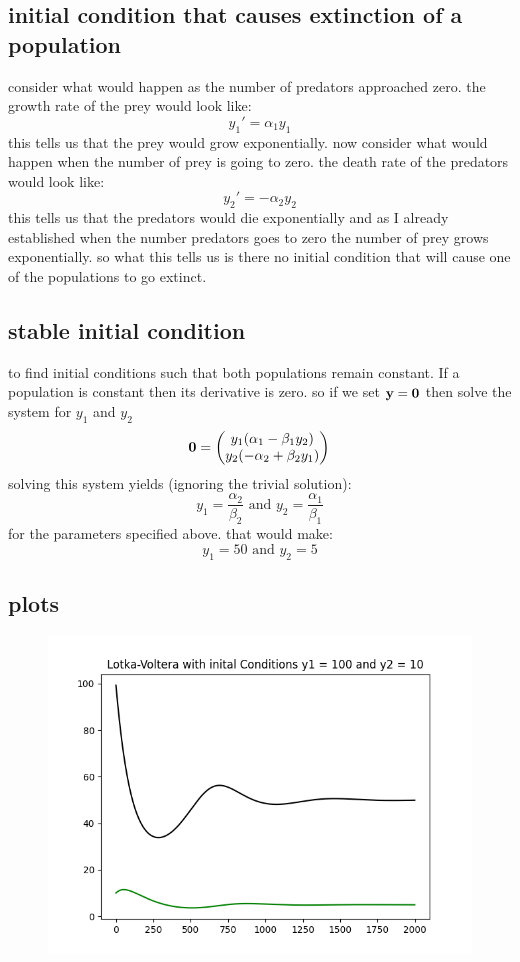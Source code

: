 \documentclass{article}
\begin{document}
\subsection{initial condition that causes extinction of a population}
consider what would happen as the number of predators approached zero. the growth rate of the prey would look like:
$$y_1' = \alpha_1y_1$$
this tells us that the prey would grow exponentially.
now consider what would happen when the number of prey is going to zero. the death rate of the predators would look like:
$$y_2' = -\alpha_2y_2$$
this tells us that the predators would die exponentially and as I already established when the number predators goes to zero the number of prey grows exponentially. so what this tells us is there no initial condition that will cause one of the populations to go extinct. 
\subsection{stable initial condition}
to find initial conditions such that both populations remain constant. If a population is constant then its derivative is zero. so if we set $\bf{y} =\bf{0} $ then solve the system for $y_1$ and $y_2$
$$
\bf{0} = 
\begin{pmatrix}
	y_1(\alpha_1-\beta_1y_2) \\ y_2(-\alpha_2+\beta_2y_1)
\end{pmatrix}
$$
solving this system yields (ignoring the trivial solution):
$$
y_1 = \frac{\alpha_2}{\beta_2} \text{ and }
y_2 = \frac{\alpha_1}{\beta_1} 
$$ 
for the parameters specified above. that would make:
$$
y_1 = 50 \text{ and }
y_2 = 5 
$$  

\subsection{plots}
\begin{figure}[hbt!]
	\centering
	\includegraphics[width=.75\linewidth]{LV_100_10.png}
	
	\label{fig: Lotka-Voltera }
\end{figure}
\end{document}

